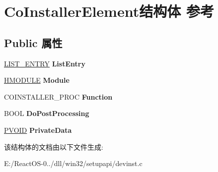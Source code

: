 \hypertarget{struct_co_installer_element}{}\section{Co\+Installer\+Element结构体 参考}
\label{struct_co_installer_element}
\subsection*{Public 属性}
\begin{DoxyCompactItemize}
\item 
\mbox{\label{struct_co_installer_element_a212775779b8b064e287aece560c83719}} 
\hyperlink{struct___l_i_s_t___e_n_t_r_y}{L\+I\+S\+T\+\_\+\+E\+N\+T\+RY} {\bfseries List\+Entry}
\item 
\mbox{\label{struct_co_installer_element_aaf943799425c9ee69fa8ac79682309e0}} 
\hyperlink{interfacevoid}{H\+M\+O\+D\+U\+LE} {\bfseries Module}
\item 
\mbox{\label{struct_co_installer_element_acc8aebbb1c468492c48f1ab1e4b6bae8}} 
C\+O\+I\+N\+S\+T\+A\+L\+L\+E\+R\+\_\+\+P\+R\+OC {\bfseries Function}
\item 
\mbox{\label{struct_co_installer_element_ac07ba05b4fc07d8bb18c5cda66abaf26}} 
B\+O\+OL {\bfseries Do\+Post\+Processing}
\item 
\mbox{\label{struct_co_installer_element_ae165f9137b84bb6b4cf9ca14d45c1c67}} 
\hyperlink{interfacevoid}{P\+V\+O\+ID} {\bfseries Private\+Data}
\end{DoxyCompactItemize}


该结构体的文档由以下文件生成\+:\begin{DoxyCompactItemize}
\item 
E\+:/\+React\+O\+S-\/0../dll/win32/setupapi/devinst.\+c\end{DoxyCompactItemize}
